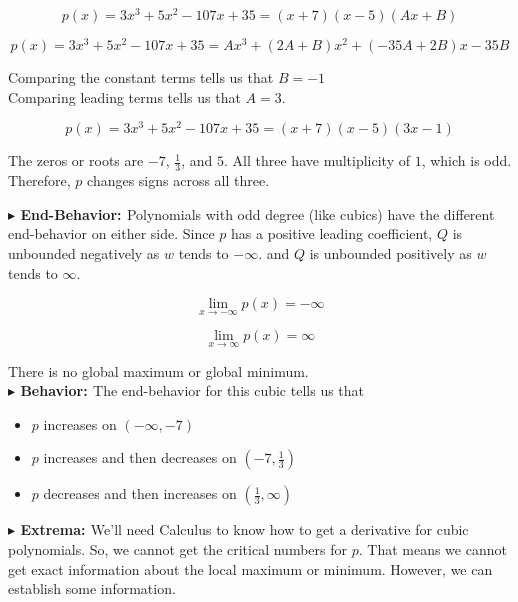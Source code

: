 \documentclass{ximera}
\begin{document}
\begin{exercise}
\[
p(x) = 3 x^3 + 5 x^2 - 107 x + 35 = (x+7)(x-5)(A x + B)
\]




\[
p(x) = 3 x^3 + 5 x^2 - 107 x + 35 = A x^3 + (2 A + B) x^2 + (-35 A + 2 B) x - 35 B 
\]


Comparing the constant terms tells us that $B = -1$ \\



Comparing leading terms tells us that $A = 3$.




\[
p(x) = 3 x^3 + 5 x^2 - 107 x + 35 = (x+7)(x-5)(3 x - 1)
\]





The zeros or roots are $-7$, $\frac{1}{3}$, and $5$.  All three have multiplicity of $1$, which is odd.  Therefore, $p$ changes signs across all three.










\textbf{\textcolor{blue!55!black}{$\blacktriangleright$ End-Behavior: }} Polynomials with odd degree (like cubics) have the different end-behavior on either side.  Since $p$ has a positive leading coefficient, $Q$ is unbounded negatively as $w$ tends to $-\infty$. and $Q$ is unbounded positively as $w$ tends to $\infty$.

\[
\lim\limits_{x \to -\infty} p(x) = -\infty
\]


\[
\lim\limits_{x \to \infty} p(x) = \infty
\]


There is no global maximum or global minimum. \\



\textbf{\textcolor{blue!55!black}{$\blacktriangleright$ Behavior: }}  The end-behavior for this cubic tells us that 



\begin{itemize}
\item $p$ increases on $(-\infty, -7)$ 
\item $p$ increases and then decreases on $\left( -7, \frac{1}{3} \right)$
\item $p$ decreases and then increases on $\left( \frac{1}{3}, \infty \right)$
\end{itemize}




\textbf{\textcolor{blue!55!black}{$\blacktriangleright$ Extrema: }}  We'll need Calculus to know how to get a derivative for cubic polynomials.  So, we cannot get the critical numbers for $p$.  That means we cannot get exact information about the local maximum or minimum.  However, we can establish some information.






\end{exercise}
\end{document}

